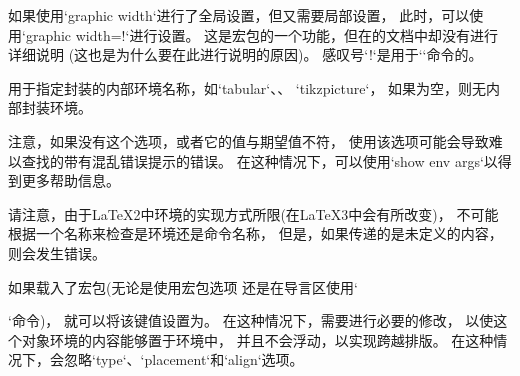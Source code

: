   如果使用`graphic width`进行了全局设置，但又需要局部设置，
  此时，可以使用`graphic width=!`进行设置。
  这是宏包的一个功能，但在\autocite{graphicx}的文档中却没有进行详细说明
  (这也是为什么要在此进行说明的原因)。
  感叹号`!`是用于`\resizebox`命令的。

\bigpar

  用于指定封装的内部环境名称，如`tabular`、、 `tikzpicture`，
  如果为空，则无内部封装环境。

  注意，如果没有这个选项，或者它的值与期望值不符，
  使用该选项可能会导致难以查找的带有混乱错误提示的错误。
  在这种情况下，可以使用`show env args`以得到更多帮助信息。

  请注意，由于\LaTeX2{}中环境的实现方式所限(在\LaTeX3中会有所改变\autocite{ltx3env})，
  不可能根据一个名称来检查是环境还是命令名称，
  但是，如果传递的是未定义的内容，则会发生错误。

  如果载入了宏包(无论是使用宏包选项
  还是在导言区使用`\usepackage{longtable}`命令)，
  就可以将该键值设置为。
  在这种情况下，需要进行必要的修改，
  以使这个对象环境的内容能够置于环境中，
  并且不会浮动，以实现跨越排版。
  在这种情况下，会忽略`type`、`placement`和`align`选项。

